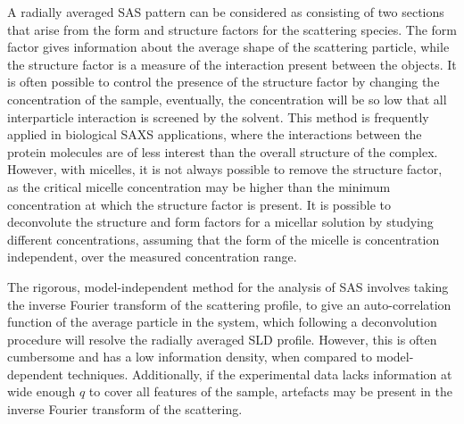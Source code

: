A radially averaged SAS pattern can be considered as consisting of two sections that arise from the form and structure factors for the scattering species.
The form factor gives information about the average shape of the scattering particle, while the structure factor is a measure of the interaction present between the objects.
It is often possible to control the presence of the structure factor by changing the concentration of the sample, eventually, the concentration will be so low that all interparticle interaction is screened by the solvent.\autocite{edler_combining_2015}
This method is frequently applied in biological SAXS applications, where the interactions between the protein molecules are of less interest than the overall structure of the complex.
However, with micelles, it is not always possible to remove the structure factor, as the critical micelle concentration may be higher than the minimum concentration at which the structure factor is present.
It is possible to deconvolute the structure and form factors for a micellar solution by studying different concentrations, assuming that the form of the micelle is concentration independent, over the measured concentration range.

The rigorous, model-independent method for the analysis of SAS involves taking the inverse Fourier transform of the scattering profile, to give an auto-correlation function of the average particle in the system, which following a deconvolution procedure will resolve the radially averaged SLD profile.
However, this is often cumbersome and has a low information density, when compared to model-dependent techniques.
Additionally, if the experimental data lacks information at wide enough $q$ to cover all features of the sample, artefacts may be present in the inverse Fourier transform of the scattering.

